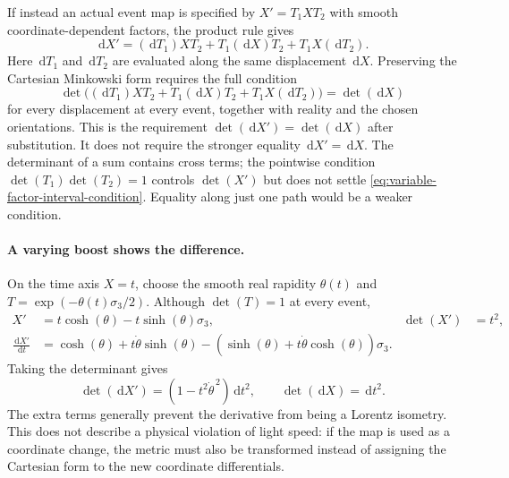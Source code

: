 \documentclass[11pt]{article}
\newcommand{\pv}[1]{{#1}}
\newcommand{\pvGreek}[1]{{#1}}
\newcommand{\pT}{\pv{T}}
\newcommand{\pX}{\pv{X}}
\newcommand{\pvsigma}{\pvGreek{\sigma}}
\numberwithin{equation}{section}
\newcommand{\dd}{\,\mathrm d}
\begin{document}
If instead an actual event map is specified by
$\pX'=\pT_1\pX\pT_2$ with smooth coordinate-dependent factors,
the product rule gives
\begin{equation}
 \boxed{\dd\pX'
 =(\dd\pT_1)\pX\pT_2+\pT_1(\dd\pX)\pT_2
                   +\pT_1\pX(\dd\pT_2).}
 \label{eq:two-sided-coordinate-differential}
\end{equation}
Here $\dd\pT_1$ and $\dd\pT_2$ are evaluated along the same
displacement $\dd\pX$. Preserving the Cartesian Minkowski form
requires the full condition
\begin{equation}
 \boxed{\det\bigl((\dd\pT_1)\pX\pT_2
           +\pT_1(\dd\pX)\pT_2+\pT_1\pX(\dd\pT_2)\bigr)
       =\det(\dd\pX)}
 \label{eq:variable-factor-interval-condition}
\end{equation}
for every displacement at every event, together with reality and
the chosen orientations. This is the requirement
$\det(\dd\pX')=\det(\dd\pX)$ after substitution.
It does not require the stronger equality $\dd\pX'=\dd\pX$.
The determinant of a sum contains cross terms; the pointwise
condition $\det(\pT_1)\det(\pT_2)=1$ controls $\det(\pX')$ but
does not settle \eqref{eq:variable-factor-interval-condition}.
Equality along just one path would be a weaker condition.

\paragraph{A varying boost shows the difference.}
On the time axis $\pX=t$, choose the smooth real rapidity
$\theta(t)$ and $\pT=\exp(-\theta(t)\pvsigma_3/2)$.
Although $\det(\pT)=1$ at every event,
\begin{align*}
 \pX'&=t\cosh(\theta)-t\sinh(\theta)\pvsigma_3,
 &\det(\pX')&=t^2,\\
 \frac{\dd\pX'}{\dd t}
 &=\cosh(\theta)+t\dot\theta\sinh(\theta)
   -(\sinh(\theta)+t\dot\theta\cosh(\theta))\pvsigma_3 .
\end{align*}
Taking the determinant gives
\[
 \boxed{\det(\dd\pX')=(1-t^2\dot\theta^{\,2})\dd t^2,
        \qquad \det(\dd\pX)=\dd t^2.}
\]
The extra terms generally prevent the derivative from being a
Lorentz isometry. This does not describe a physical violation of
light speed: if the map is used as a coordinate change, the metric
must also be transformed instead of assigning the Cartesian form
to the new coordinate differentials.
\end{document}

